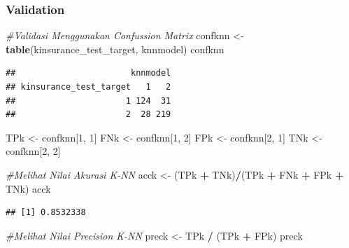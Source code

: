 \documentclass[]{article}
\newenvironment{Shaded}{\begin{snugshade}}{\end{snugshade}}
\newcommand{\CommentTok}[1]{\textcolor[rgb]{0.56,0.35,0.01}{\textit{#1}}}
\newcommand{\DecValTok}[1]{\textcolor[rgb]{0.00,0.00,0.81}{#1}}
\newcommand{\KeywordTok}[1]{\textcolor[rgb]{0.13,0.29,0.53}{\textbf{#1}}}
\newcommand{\NormalTok}[1]{#1}
\newcommand{\OperatorTok}[1]{\textcolor[rgb]{0.81,0.36,0.00}{\textbf{#1}}}
\newcommand{\StringTok}[1]{\textcolor[rgb]{0.31,0.60,0.02}{#1}}
\begin{document}
\hypertarget{validation-2}{%
\subsubsection{Validation}\label{validation-2}}

\begin{Shaded}
\begin{Highlighting}[]
\CommentTok{#Validasi Menggunakan Confussion Matrix}
\NormalTok{confknn <-}\StringTok{ }\KeywordTok{table}\NormalTok{(kinsurance_test_target, knnmodel)}
\NormalTok{confknn}
\end{Highlighting}
\end{Shaded}

\begin{verbatim}
##                       knnmodel
## kinsurance_test_target   1   2
##                      1 124  31
##                      2  28 219
\end{verbatim}

\begin{Shaded}
\begin{Highlighting}[]
\NormalTok{TPk <-}\StringTok{ }\NormalTok{confknn[}\DecValTok{1}\NormalTok{, }\DecValTok{1}\NormalTok{] }
\NormalTok{FNk <-}\StringTok{ }\NormalTok{confknn[}\DecValTok{1}\NormalTok{, }\DecValTok{2}\NormalTok{] }
\NormalTok{FPk <-}\StringTok{ }\NormalTok{confknn[}\DecValTok{2}\NormalTok{, }\DecValTok{1}\NormalTok{] }
\NormalTok{TNk <-}\StringTok{ }\NormalTok{confknn[}\DecValTok{2}\NormalTok{, }\DecValTok{2}\NormalTok{]}
\end{Highlighting}
\end{Shaded}

\begin{Shaded}
\begin{Highlighting}[]
\CommentTok{#Melihat Nilai Akurasi K-NN}
\NormalTok{acck <-}\StringTok{ }\NormalTok{(TPk }\OperatorTok{+}\StringTok{ }\NormalTok{TNk)}\OperatorTok{/}\NormalTok{(TPk }\OperatorTok{+}\StringTok{ }\NormalTok{FNk }\OperatorTok{+}\StringTok{ }\NormalTok{FPk }\OperatorTok{+}\StringTok{ }\NormalTok{TNk)}
\NormalTok{acck}
\end{Highlighting}
\end{Shaded}

\begin{verbatim}
## [1] 0.8532338
\end{verbatim}

\begin{Shaded}
\begin{Highlighting}[]
\CommentTok{#Melihat Nilai Precision K-NN}
\NormalTok{preck <-}\StringTok{ }\NormalTok{TPk }\OperatorTok{/}\StringTok{ }\NormalTok{(TPk }\OperatorTok{+}\StringTok{ }\NormalTok{FPk)}
\NormalTok{preck}
\end{Highlighting}
\end{Shaded}
\end{document}
